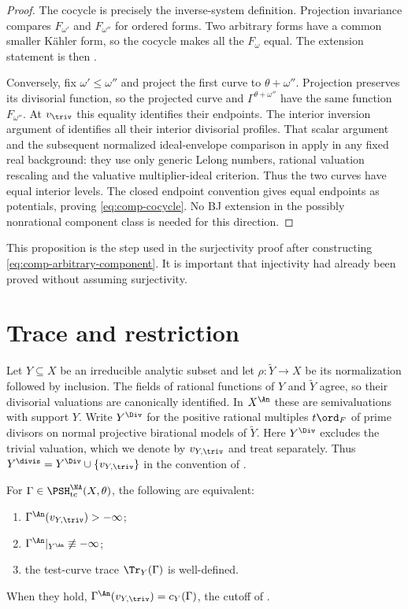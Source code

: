 \begin{proof}
The cocycle is precisely the inverse-system definition.
Projection invariance compares $F_{\omega'}$ and $F_{\omega''}$
for ordered forms. Two arbitrary forms have a common smaller K\"ahler
form, so the cocycle makes all the $F_\omega$ equal.
The extension statement is then .

Conversely, fix $\omega'\leq\omega''$ and project the first curve
to $\theta+\omega''$. Projection preserves its divisorial function,
so the projected curve and $\Gamma^{\theta+\omega''}$ have the
same function $F_{\omega''}$. At $v_{\triv}$ this equality identifies
their endpoints. The interior inversion argument of
 identifies all their
interior divisorial profiles. That scalar argument and the subsequent
normalized ideal-envelope comparison in
 apply in any fixed real background:
they use only generic Lelong numbers, rational valuation rescaling
and the valuative multiplier-ideal criterion. Thus the two curves
have equal interior levels. The closed endpoint convention gives
equal endpoints as potentials, proving \eqref{eq:comp-cocycle}.
No BJ extension in the possibly nonrational component class is
needed for this direction.
\end{proof}

This proposition is the step used in the surjectivity proof after constructing
\eqref{eq:comp-arbitrary-component}.
It is important that injectivity had already been proved without assuming
surjectivity.

\section{Trace and restriction}
\label{sec:comp-trace}

Let $Y\subseteq X$ be an irreducible analytic subset and let
$\rho:\widetilde Y\to X$ be its normalization followed by inclusion.
The fields of rational functions of $Y$ and $\widetilde Y$ agree,
so their divisorial valuations are canonically identified.
In $X^{\An}$ these are semivaluations with support $Y$.
Write $Y^{\Div}$ for the positive rational multiples $t\ord_F$ of
prime divisors on normal projective birational models of $\widetilde Y$.
Here $Y^{\Div}$ excludes the trivial valuation, which we denote by
$v_{Y,\triv}$ and treat separately. Thus
$Y^{\divis}=Y^{\Div}\cup\{v_{Y,\triv}\}$ in the convention of
.

\begin{proposition}\label{prop:comp-restriction-criterion}
For $\Gamma\in\PSH^{\NA}_{\mathrm{tc}}(X,\theta)$, the following
are equivalent:
\begin{enumerate}
\item $\Gamma^{\An}(v_{Y,\triv})>-\infty$;
\item $\Gamma^{\An}|_{Y^{\An}}\not\equiv-\infty$;
\item the test-curve trace $\Tr_Y(\Gamma)$ is well-defined.
\end{enumerate}
When they hold, $\Gamma^{\An}(v_{Y,\triv})=c_Y(\Gamma)$,
the cutoff of .
\end{proposition}

